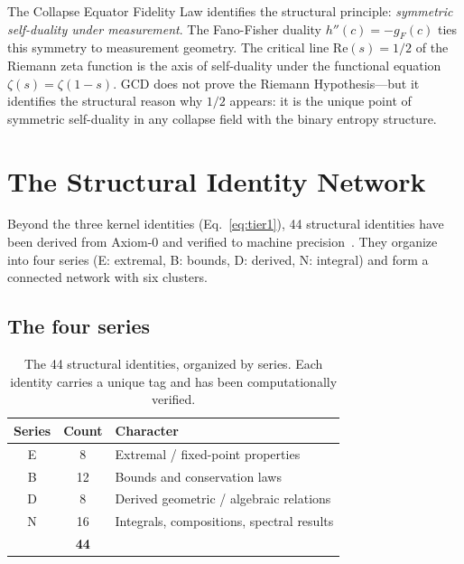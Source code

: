 \documentclass[
  aps,
  prd,
  twocolumn,
  superscriptaddress,
  nofootinbib,
  floatfix
]{revtex4-2}
\newcommand{\gF}{g_{\!F}}
\begin{document}
The Collapse Equator Fidelity Law identifies the structural
principle: \emph{symmetric self-duality under measurement}.
The Fano-Fisher duality $h''(c) = -\gF(c)$ ties this symmetry to
measurement geometry.  The critical line $\mathrm{Re}(s) = 1/2$ of
the Riemann zeta function is the axis of self-duality under the
functional equation $\zeta(s) = \zeta(1 - s)$.  GCD does not prove
the Riemann Hypothesis---but it identifies the structural reason
why $1/2$ appears: it is the unique point of symmetric self-duality
in any collapse field with the binary entropy structure.

\section{The Structural Identity Network}\label{sec:identities}

Beyond the three kernel identities (Eq.~\ref{eq:tier1}), 44
structural identities have been derived from Axiom-0 and verified
to machine precision~\cite{umcpmetadatarepo}.  They organize into
four series (E: extremal, B: bounds, D: derived, N: integral) and
form a connected network with six clusters.

\subsection{The four series}

\begin{table}[t]
\caption{\label{tab:identity-series}The 44 structural identities,
organized by series.  Each identity carries a unique tag and has
been computationally verified.}
\begin{ruledtabular}
\begin{tabular}{ccp{4.8cm}}
Series & Count & Character \\
\midrule
E & 8 & Extremal / fixed-point properties \\
B & 12 & Bounds and conservation laws \\
D & 8 & Derived geometric / algebraic relations \\
N & 16 & Integrals, compositions, spectral results \\
\midrule
 & \textbf{44} & \\
\end{tabular}
\end{ruledtabular}
\end{table}
\end{document}

